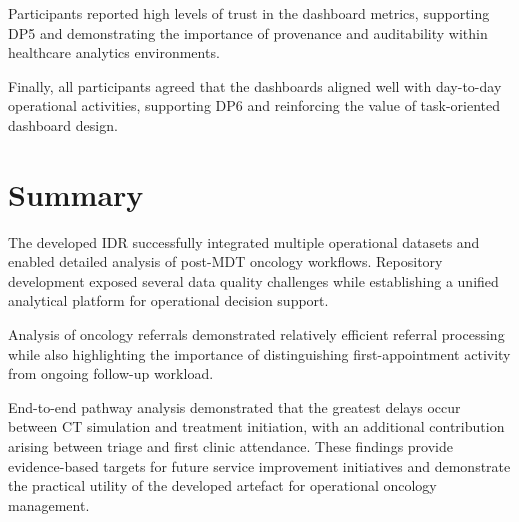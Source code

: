 Participants reported high levels of trust in the dashboard metrics, supporting DP5 and demonstrating the importance of provenance and auditability within healthcare analytics environments. 

Finally, all participants agreed that the dashboards aligned well with day-to-day operational activities, supporting DP6 and reinforcing the value of task-oriented dashboard design.


\section{Summary}
The developed IDR successfully integrated multiple operational datasets and enabled detailed analysis of post-MDT oncology workflows. Repository development exposed several data quality challenges while establishing a unified analytical platform for operational decision support.

Analysis of oncology referrals demonstrated relatively efficient referral processing while also highlighting the importance of distinguishing first-appointment activity from ongoing follow-up workload.

End-to-end pathway analysis demonstrated that the greatest delays occur between CT simulation and treatment initiation, with an additional contribution arising between triage and first clinic attendance. These findings provide evidence-based targets for future service improvement initiatives and demonstrate the practical utility of the developed artefact for operational oncology management.
